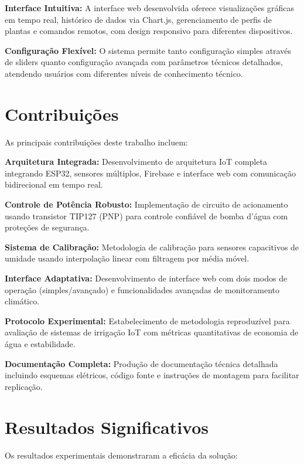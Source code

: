 \textbf{Interface Intuitiva:} A interface web desenvolvida oferece visualizações gráficas em tempo real, histórico de dados via Chart.js, gerenciamento de perfis de plantas e comandos remotos, com design responsivo para diferentes dispositivos.

\textbf{Configuração Flexível:} O sistema permite tanto configuração simples através de sliders quanto configuração avançada com parâmetros técnicos detalhados, atendendo usuários com diferentes níveis de conhecimento técnico.

\section{Contribuições}

As principais contribuições deste trabalho incluem:

\textbf{Arquitetura Integrada:} Desenvolvimento de arquitetura IoT completa integrando ESP32, sensores múltiplos, Firebase e interface web com comunicação bidirecional em tempo real.

\textbf{Controle de Potência Robusto:} Implementação de circuito de acionamento usando transistor TIP127 (PNP) para controle confiável de bomba d'água com proteções de segurança.

\textbf{Sistema de Calibração:} Metodologia de calibração para sensores capacitivos de umidade usando interpolação linear com filtragem por média móvel.

\textbf{Interface Adaptativa:} Desenvolvimento de interface web com dois modos de operação (simples/avançado) e funcionalidades avançadas de monitoramento climático.

\textbf{Protocolo Experimental:} Estabelecimento de metodologia reproduzível para avaliação de sistemas de irrigação IoT com métricas quantitativas de economia de água e estabilidade.

\textbf{Documentação Completa:} Produção de documentação técnica detalhada incluindo esquemas elétricos, código fonte e instruções de montagem para facilitar replicação.

\section{Resultados Significativos}

Os resultados experimentais demonstraram a eficácia da solução:


